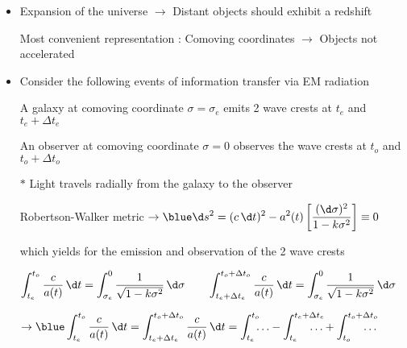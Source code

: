 \onecolumn
\begin{itemize}
\item Expansion of the universe $\rightarrow$ Distant objects should exhibit a redshift
\item[] Most convenient representation : Comoving coordinates $\rightarrow$ Objects not accelerated
\item Consider the following events of information transfer via EM radiation
\item[] A galaxy at comoving coordinate $\sigma=\sigma_{e}$ emits 2 wave crests
        at $t_{e}$ and $t_{e}+\Delta t_{e}$
\item[] An observer at comoving coordinate $\sigma=0$ observes the wave crests
        at $t_{o}$ and $t_{o}+\Delta t_{o}$
\item[$\ast$] Light travels radially from the galaxy to the observer
\item[] Robertson-Walker metric
        $\displaystyle \rightarrow
        {\blue \d s^{2}=(c\,\d t)^{2}-a^{2}(t)\left[\frac{(\d\sigma)^{2}}{1-k\sigma^{2}}\right] \equiv 0}$
\item[] which yields for the emission and observation of the 2 wave crests
\item[] $\displaystyle \int_{t_{e}}^{t_{o}} \frac{c}{a(t)}\,\d t
         = \int_{\sigma_{e}}^{0} \frac{1}{\sqrt{1-k\sigma^{2}}}\,\d\sigma \qquad
         \int_{t_{e}+\Delta t_{e}}^{t_{o}+\Delta t_{o}} \frac{c}{a(t)}\,\d t
         = \int_{\sigma_{e}}^{0} \frac{1}{\sqrt{1-k\sigma^{2}}}\,\d\sigma$\\
\item[] $\displaystyle \rightarrow {\blue \int_{t_{e}}^{t_{o}} \frac{c}{a(t)}\,\d t =
         \int_{t_{e}+\Delta t_{e}}^{t_{o}+\Delta t_{o}} \frac{c}{a(t)}\,\d t =
         \int_{t_{e}}^{t_{o}} \!\!\!\ldots -
         \int_{t_{e}}^{t_{e}+\Delta t_{e}} \!\!\!\!\!\!\!\!\!\ldots +
         \int_{t_{o}}^{t_{o}+\Delta t_{o}} \!\!\!\!\!\!\!\!\!\ldots}$
\end{itemize}

